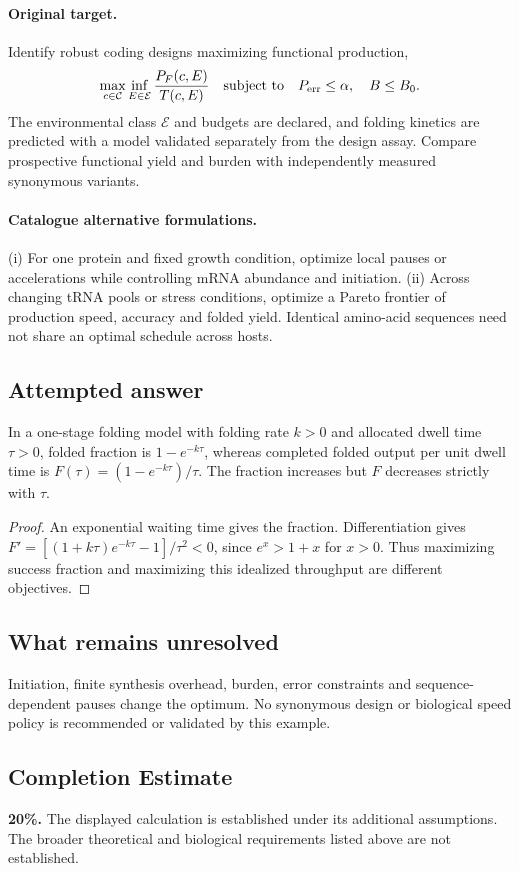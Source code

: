 \documentclass[11pt]{article}
\begin{document}
\paragraph{Original target.}
Identify robust coding designs maximizing functional production,
\[\max_{c\in\mathcal C}\inf_{E\in\mathcal E}\frac{P_F(c,E)}{T(c,E)}\quad\text{subject to}\quad P_{\rm err}\le\alpha,\quad B\le B_0.\]
The environmental class $\mathcal E$ and budgets are declared, and folding kinetics are predicted with a model validated separately from the design assay. Compare prospective functional yield and burden with independently measured synonymous variants.
\paragraph{Catalogue alternative formulations.}
(i) For one protein and fixed growth condition, optimize local pauses or accelerations while controlling mRNA abundance and initiation. (ii) Across changing tRNA pools or stress conditions, optimize a Pareto frontier of production speed, accuracy and folded yield. Identical amino-acid sequences need not share an optimal schedule across hosts.
\subsection{Attempted answer}
\begin{proposition}
In a one-stage folding model with folding rate $k>0$ and allocated dwell time $\tau>0$, folded fraction is $1-e^{-k\tau}$, whereas completed folded output per unit dwell time is $F(\tau)=(1-e^{-k\tau})/\tau$. The fraction increases but $F$ decreases strictly with $\tau$.
\end{proposition}
\begin{proof}
An exponential waiting time gives the fraction. Differentiation gives $F\prime=[(1+k\tau)e^{-k\tau}-1]/\tau^2<0$, since $e^x>1+x$ for $x>0$. Thus maximizing success fraction and maximizing this idealized throughput are different objectives.
\end{proof}
\subsection{What remains unresolved}
Initiation, finite synthesis overhead, burden, error constraints and sequence-dependent pauses change the optimum. No synonymous design or biological speed policy is recommended or validated by this example.
\subsection{Completion Estimate}
\textbf{20\%.} The displayed calculation is established under its additional assumptions. The broader theoretical and biological requirements listed above are not established.
\end{document}
